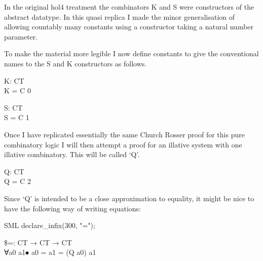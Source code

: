 In the original hol4 treatment the combinators K and S were constructors of the abstract datatype.
In this quasi replica I made the minor generalisation of allowing countably many constants using a constructor taking a natural number parameter.

To make the material more legible I now define constants to give the conventional names to the S and K constructors as follows.

\begin{HOLConst}
\+\PrNM{} \PrNL{}K\PrNN{}: CT\\
\PrPH{}\PrPM{}\PrPM{}\PrPM{}\PrPM{}\PrPM{}\PrPM{}\PrPM{}\PrPM{}\PrPM{}\PrPM{}\PrPM{}
\+\PrNM{}	K = C 0\\
\end{HOLConst}

\begin{HOLConst}
\+\PrNM{} \PrNL{}S\PrNN{}: CT\\
\PrPH{}\PrPM{}\PrPM{}\PrPM{}\PrPM{}\PrPM{}\PrPM{}\PrPM{}\PrPM{}\PrPM{}\PrPM{}\PrPM{}
\+\PrNM{}	S = C 1\\
\end{HOLConst}

Once I have replicated essentially the same Church Rosser proof for this pure combinatory logic I will then attempt a proof for an illative system with one illative combinatory.
This will be called `Q'.

\begin{HOLConst}
\+\PrNM{} \PrNL{}Q\PrNN{}: CT\\
\PrPH{}\PrPM{}\PrPM{}\PrPM{}\PrPM{}\PrPM{}\PrPM{}\PrPM{}\PrPM{}\PrPM{}\PrPM{}\PrPM{}
\+\PrNM{}	Q = C 2\\
\end{HOLConst}

Since `Q' is intended to be a close approximation to equality, it might be nice to have the following way of writing equations:

\begin{GFT}{SML}
\+declare\_infix(300, "=");\\
\end{GFT}


\begin{HOLConst}
\+\PrNM{} \$\PrNL{}=\PrNN{}: CT → CT → CT\\
\PrPH{}\PrPM{}\PrPM{}\PrPM{}\PrPM{}\PrPM{}\PrPM{}\PrPM{}\PrPM{}\PrPM{}\PrPM{}\PrPM{}
\+\PrNM{} ∀a0 a1⦁ a0 = a1 = (Q  a0)  a1\\
\end{HOLConst}

